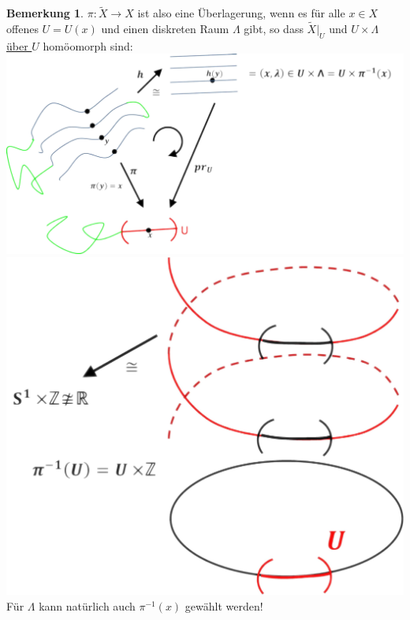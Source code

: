 \documentclass[a4paper,11pt,notitlepage]{report}
\theoremstyle{definition}
\newtheorem{remark}{Bemerkung}[chapter]
\begin{document}
\begin{remark}
	$\pi \colon \tilde{X} \rightarrow X$ ist also eine Überlagerung, wenn es für alle $x \in X$ offenes $U=U(x)$ und einen diskreten Raum $\Lambda$ gibt, so dass $\tilde{X} \big |_U$ und $U \times \Lambda$ \underline{über $U$} homöomorph sind:
	\includegraphics[scale=0.4]{images/lokal_trivialisierend.png} \newline
	\includegraphics[scale=0.4]{images/lokal_trivialisierend2.png} \newline
	Für $\Lambda$ kann natürlich auch $\pi^{-1}(x)$ gewählt werden!
\end{remark}
\end{document}
